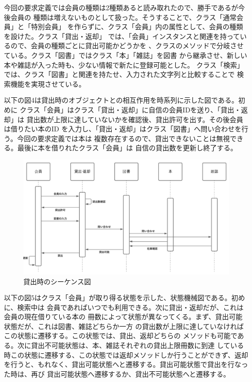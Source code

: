 \documentclass[dvipdfmx,autodetect-engine,titlepage]{jsarticle}
\begin{document}
今回の要求定義では会員の種類は2種類あると読み取れたので、勝手であるが今後会員の
種類は増えないものとして扱った。そうすることで、クラス「通常会員」と「特別会員」
を作らずに、クラス「会員」内の属性として、会員の種類を設けた。クラス「貸出・返却」
では、「会員」インスタンスと関連を持っているので、会員の種類ごとに貸出可能かどうかを
、クラスのメソッドで分岐させている。クラス「図書」ではクラス「本」「雑誌」を図書
から継承させ、新しい本や雑誌が入った時も、少ない情報で新たに登録可能とした。
クラス「検索」では、クラス「図書」と関連を持たせ、入力された文字列と比較することで
検索機能を実現させている。

以下の図4は貸出時のオブジェクトとの相互作用を時系列に示した図である。初めに
クラス「会員」はクラス「貸出・返却」に自信の会員IDを送り、「貸出・返却」は
貸出数が上限に達していないかを確認後、貸出許可を出す。その後会員は借りたい本のID
を入力し、「貸出・返却」はクラス「図書」へ問い合わせを行う。今回の要求定義では本は
複数存在するので、貸出できないことは無視できる。最後に本を借りれたクラス「会員」は
自信の貸出数を更新し終了する。


\begin{figure}[h]
  \centering
  \includegraphics[scale=1]{pic4.png}
  \caption{貸出時のシーケンス図}
\end{figure}

以下の図5はクラス「会員」が取り得る状態を示した、状態機械図である。初めに、検索中は
会員であればいつでも利用できる。次に貸出・返却だが、これは会員の現在借りている本の
冊数によって状態が異なってくる。まず、貸出可能状態だが、これは図書、雑誌どちらか一方
の貸出数が上限に達していなければこの状態に遷移する。この状態では、貸出、返却どちらの
メソッドも可能である。次に貸出不可能状態は、本、雑誌それぞれの貸出上限冊数に到達
している時この状態に遷移する、この状態では返却メソッドしか行うことができず、返却
を行うと、もれなく、貸出可能状態へと遷移する。貸出可能状態で貸出を行なった時は、再び
貸出可能状態へ遷移するか、貸出不可能状態へと遷移する。
\end{document}
